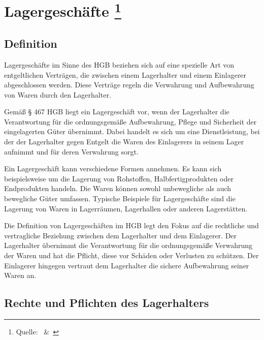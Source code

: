 

\chapter[Lagergeschäfte]{Lagergeschäfte \footnote{Quelle:~\cite{Handelsrecht} \&~\cite{lagergeschaeft}}}

\section{Definition}
Lagergeschäfte im Sinne des \ac{HGB} beziehen sich auf eine spezielle Art von entgeltlichen Verträgen, die zwischen einem Lagerhalter und einem Einlagerer abgeschlossen werden. Diese Verträge regeln die Verwahrung und Aufbewahrung von Waren durch den Lagerhalter.

Gemäß § 467 \ac{HGB} liegt ein Lagergeschäft vor, wenn der Lagerhalter die Verantwortung für die ordnungsgemäße Aufbewahrung, Pflege und Sicherheit der eingelagerten Güter übernimmt. Dabei handelt es sich um eine Dienstleistung, bei der der Lagerhalter gegen Entgelt die Waren des Einlagerers in seinem Lager aufnimmt und für deren Verwahrung sorgt.

Ein Lagergeschäft kann verschiedene Formen annehmen. Es kann sich beispielsweise um die Lagerung von Rohstoffen, Halbfertigprodukten oder Endprodukten handeln. Die Waren können sowohl unbewegliche als auch bewegliche Güter umfassen. Typische Beispiele für Lagergeschäfte sind die Lagerung von Waren in Lagerräumen, Lagerhallen oder anderen Lagerstätten.

Die Definition von Lagergeschäften im \ac{HGB} legt den Fokus auf die rechtliche und vertragliche Beziehung zwischen dem Lagerhalter und dem Einlagerer. Der Lagerhalter übernimmt die Verantwortung für die ordnungsgemäße Verwahrung der Waren und hat die Pflicht, diese vor Schäden oder Verlusten zu schützen. Der Einlagerer hingegen vertraut dem Lagerhalter die sichere Aufbewahrung seiner Waren an.
\section{Rechte und Pflichten des Lagerhalters}

